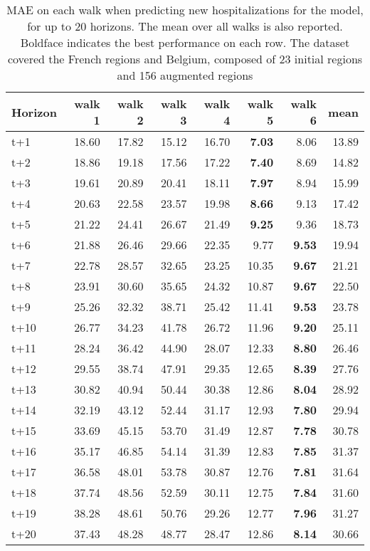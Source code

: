 \begin{table}[H]
\centering
\caption{MAE on each walk when predicting new hospitalizations for the model, for up to 20 horizons. The mean over all walks is also reported. Boldface indicates the best performance on each row. The dataset covered the French regions and Belgium, composed of 23 initial regions and 156 augmented regions }
\label{tab:MAE_walk_encoder_decoder}
\begin{tabular}{lrrrrrrr}
\toprule
Horizon &  walk 1 &  walk 2 &  walk 3 &  walk 4 &  walk 5 &  walk 6 &  mean \\
\midrule
t+1  & 18.60  & 17.82  & 15.12  & 16.70  & \textbf{7.03}  & 8.06  & 13.89  \\
t+2  & 18.86  & 19.18  & 17.56  & 17.22  & \textbf{7.40}  & 8.69  & 14.82  \\
t+3  & 19.61  & 20.89  & 20.41  & 18.11  & \textbf{7.97}  & 8.94  & 15.99  \\
t+4  & 20.63  & 22.58  & 23.57  & 19.98  & \textbf{8.66}  & 9.13  & 17.42  \\
t+5  & 21.22  & 24.41  & 26.67  & 21.49  & \textbf{9.25}  & 9.36  & 18.73  \\
t+6  & 21.88  & 26.46  & 29.66  & 22.35  & 9.77  & \textbf{9.53}  & 19.94  \\
t+7  & 22.78  & 28.57  & 32.65  & 23.25  & 10.35  & \textbf{9.67}  & 21.21  \\
t+8  & 23.91  & 30.60  & 35.65  & 24.32  & 10.87  & \textbf{9.67}  & 22.50  \\
t+9  & 25.26  & 32.32  & 38.71  & 25.42  & 11.41  & \textbf{9.53}  & 23.78  \\
t+10  & 26.77  & 34.23  & 41.78  & 26.72  & 11.96  & \textbf{9.20}  & 25.11  \\
t+11  & 28.24  & 36.42  & 44.90  & 28.07  & 12.33  & \textbf{8.80}  & 26.46  \\
t+12  & 29.55  & 38.74  & 47.91  & 29.35  & 12.65  & \textbf{8.39}  & 27.76  \\
t+13  & 30.82  & 40.94  & 50.44  & 30.38  & 12.86  & \textbf{8.04}  & 28.92  \\
t+14  & 32.19  & 43.12  & 52.44  & 31.17  & 12.93  & \textbf{7.80}  & 29.94  \\
t+15  & 33.69  & 45.15  & 53.70  & 31.49  & 12.87  & \textbf{7.78}  & 30.78  \\
t+16  & 35.17  & 46.85  & 54.14  & 31.39  & 12.83  & \textbf{7.85}  & 31.37  \\
t+17  & 36.58  & 48.01  & 53.78  & 30.87  & 12.76  & \textbf{7.81}  & 31.64  \\
t+18  & 37.74  & 48.56  & 52.59  & 30.11  & 12.75  & \textbf{7.84}  & 31.60  \\
t+19  & 38.28  & 48.61  & 50.76  & 29.26  & 12.77  & \textbf{7.96}  & 31.27  \\
t+20  & 37.43  & 48.28  & 48.77  & 28.47  & 12.86  & \textbf{8.14}  & 30.66  \\

\bottomrule
\end{tabular}
\end{table}
